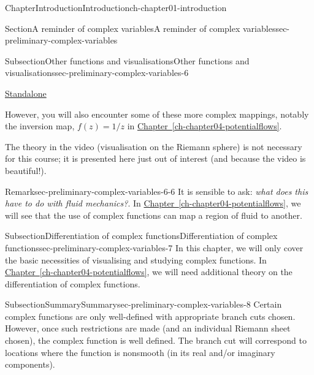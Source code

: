 \documentclass[oneside,10pt,]{book}
\newcommand{\xreffont}{\relax}
\numberwithin{equation}{section}
\begin{document}
\begin{chapterptx}{Chapter}{Introduction}{}{Introduction}{}{}{ch-chapter01-introduction}
\begin{sectionptx}{Section}{A reminder of complex variables}{}{A reminder of complex variables}{}{}{sec-preliminary-complex-variables}
\begin{subsectionptx}{Subsection}{Other functions and visualisations}{}{Other functions and visualisations}{}{}{sec-preliminary-complex-variables-6}
\begin{sidebyside}{2}{0.075}{0.075}{0.17}
\begin{sbspanel}{0.21}
\href{https://trinh.github.io/BathMAFluids/sec-preliminary-complex-variables-6-3.html}{Standalone}%
\end{sbspanel}%
\end{sidebyside}%
\par
However, you will also encounter some of these more complex mappings, notably the inversion map, \(f(z) = 1/z\) in \hyperref[ch-chapter04-potentialflows]{Chapter~{\xreffont\ref{ch-chapter04-potentialflows}}}.%
\par
The theory in the video (visualisation on the Riemann sphere) is not necessary for this course; it is presented here just out of interest (and because the video is beautiful!).%
\begin{remark}{Remark}{}{sec-preliminary-complex-variables-6-6}%
It is sensible to ask: \emph{what does this have to do with fluid mechanics?}. In \hyperref[ch-chapter04-potentialflows]{Chapter~{\xreffont\ref{ch-chapter04-potentialflows}}}, we will see that the use of complex functions can map a region of fluid to another.%
\end{remark}
\end{subsectionptx}
%
%
\typeout{************************************************}
\typeout{************************************************}
%
\begin{subsectionptx}{Subsection}{Differentiation of complex functions}{}{Differentiation of complex functions}{}{}{sec-preliminary-complex-variables-7}
In this chapter, we will only cover the basic necessities of visualising and studying complex functions. In \hyperref[ch-chapter04-potentialflows]{Chapter~{\xreffont\ref{ch-chapter04-potentialflows}}}, we will need additional theory on the differentiation of complex functions.%
\end{subsectionptx}
%
%
\typeout{************************************************}
\typeout{************************************************}
%
\begin{subsectionptx}{Subsection}{Summary}{}{Summary}{}{}{sec-preliminary-complex-variables-8}
Certain complex functions are only well-defined with appropriate branch cuts chosen. However, once such restrictions are made (and an individual Riemann sheet chosen), the complex function is well defined. The branch cut will correspond to locations where the function is nonsmooth (in its real and\slash{}or imaginary components).%
\end{subsectionptx}
\end{sectionptx}

\end{chapterptx}
\end{document}
